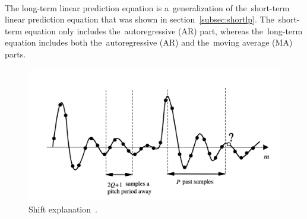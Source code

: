 \\
The long-term linear prediction equation is a~generalization of the~short-term linear prediction equation that was shown in section~\ref{subsec:shortlp}. The~short-term equation only includes the~autoregressive (AR) part, whereas the~long-term equation includes both the~autoregressive (AR) and the~moving average (MA) parts.
\begin{center}
    \begin{figure}[!ht]
        \centering
        \includegraphics[width=1\textwidth]{figures/shift}
        \caption{Shift explanation~\cite{vaseghi2008advanced}.}
        \label{fig:shiftExplain}
    \end{figure}
\end{center}

